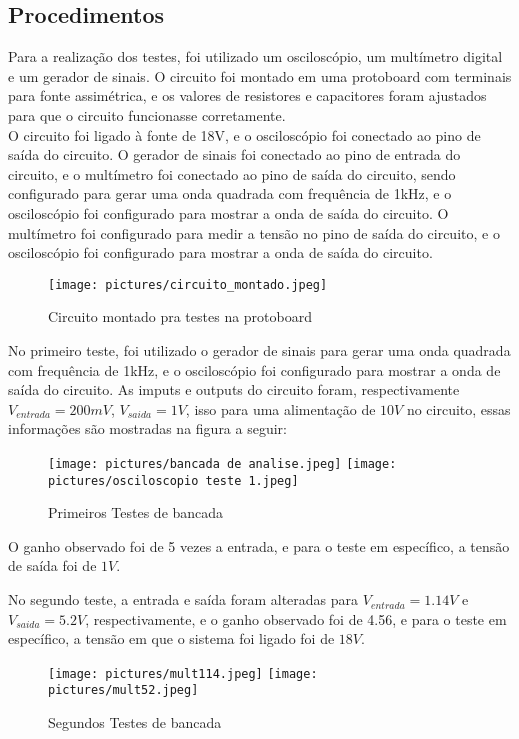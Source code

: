     \subsection{Procedimentos}
    \label{subsec:procedimentos}
    \indent Para a realização dos testes, foi utilizado um osciloscópio, um multímetro digital e um gerador de sinais.
    O circuito foi montado em uma protoboard com terminais para fonte assimétrica, e os valores de resistores e capacitores foram ajustados para que o circuito funcionasse corretamente.\\

    \indent O circuito foi ligado à fonte de 18V, e o osciloscópio foi conectado ao pino de saída do circuito.
    O gerador de sinais foi conectado ao pino de entrada do circuito, e o multímetro foi conectado ao pino de saída do circuito, sendo configurado para gerar uma onda quadrada com frequência de 1kHz, e o osciloscópio foi configurado para mostrar a onda de saída do circuito.
    O multímetro foi configurado para medir a tensão no pino de saída do circuito, e o osciloscópio foi configurado para mostrar a onda de saída do circuito.\\

    \begin{figure}[h!]
        \centering
        \texttt{[image: pictures/circuito\_montado.jpeg]}
        \caption{Circuito montado pra testes na protoboard}
        \label{fig:fig1}
    \end{figure}

    \indent No primeiro teste, foi utilizado o gerador de sinais para gerar uma onda quadrada com frequência de 1kHz, e o osciloscópio foi configurado para mostrar a onda de saída do circuito.
     As imputs e outputs do circuito foram, respectivamente $V_{entrada} = 200mV$, $V_{saida} = 1V$, isso para uma alimentação de $10V$ no circuito, essas informações são mostradas na figura a seguir:
    \begin{figure}[h!]
        \centering
        \texttt{[image: pictures/bancada de analise.jpeg]} \quad
        \texttt{[image: pictures/osciloscopio teste 1.jpeg]}
        \caption{Primeiros Testes de bancada}
        \label{fig:fig2e4}
    \end{figure}

    \indent O ganho observado foi de 5 vezes a entrada, e para o teste em específico, a tensão de saída foi de $1V$.

    \newpage

    \indent No segundo teste, a entrada e saída foram alteradas para $V_{entrada} = 1.14V$ e $V_{saida} = 5.2V$, respectivamente, e o ganho observado foi de 4.56, e para o teste em específico, a tensão em que o sistema foi ligado foi de $18V$.

    \begin{figure}[h!]
        \centering
        \texttt{[image: pictures/mult114.jpeg]} \quad
        \texttt{[image: pictures/mult52.jpeg]}
        \caption{Segundos Testes de bancada}
        \label{fig:fig5e6}
    \end{figure}

